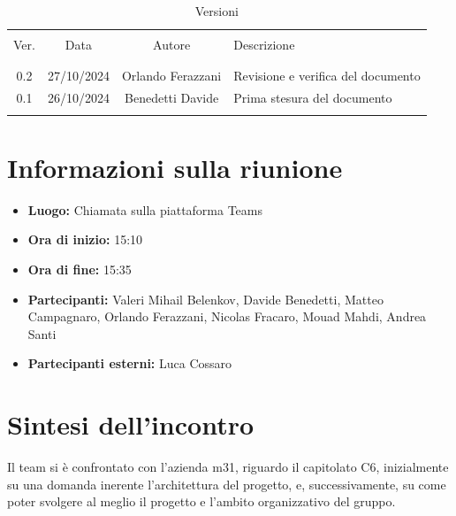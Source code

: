 \documentclass[italian, 12pt]{article}
\begin{document}
\pagestyle{mystyle}


\begin{table}[!h]
	\caption{Versioni}
	\begin{center}
		\begin{tabular}{ c c c p{9cm}}
			\hline \\[-2ex]
			Ver. & Data & Autore & Descrizione \\
			\\[-2ex] \hline \\[-1.5ex]
            0.2 & 27/10/2024 & Orlando Ferazzani & Revisione e verifica del documento \\
			0.1 & 26/10/2024 & Benedetti Davide & Prima stesura del documento\\
			\\[-1.5ex] \hline
		\end{tabular}
	\end{center}
\end{table}


\tableofcontents
\newpage


\section{Informazioni sulla riunione}
\begin{itemize}
    \item \textbf{Luogo:} Chiamata sulla piattaforma Teams
    \item \textbf{Ora di inizio:} 15:10
    \item \textbf{Ora di fine:} 15:35
    \item \textbf{Partecipanti:} Valeri Mihail Belenkov, Davide Benedetti, Matteo Campagnaro, Orlando Ferazzani, Nicolas Fracaro, Mouad Mahdi, Andrea Santi 
    \item \textbf{Partecipanti esterni:} Luca Cossaro 
\end{itemize}

\section{Sintesi dell'incontro}
Il team si è confrontato con l'azienda m31, riguardo il capitolato C6, inizialmente su una domanda inerente l'architettura del progetto, e, successivamente, su come poter svolgere al meglio il progetto e l'ambito organizzativo del gruppo.
\end{document}

